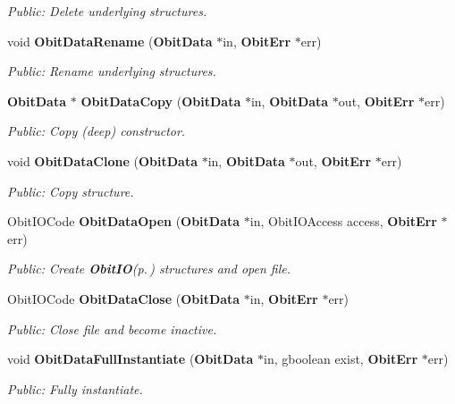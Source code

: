 \begin{CompactItemize}
\begin{CompactList}\small\item\em Public: Delete underlying structures. \item\end{CompactList}\item 
void {\bf Obit\-Data\-Rename} ({\bf Obit\-Data} $\ast$in, {\bf Obit\-Err} $\ast$err)
\begin{CompactList}\small\item\em Public: Rename underlying structures. \item\end{CompactList}\item 
{\bf Obit\-Data} $\ast$ {\bf Obit\-Data\-Copy} ({\bf Obit\-Data} $\ast$in, {\bf Obit\-Data} $\ast$out, {\bf Obit\-Err} $\ast$err)
\begin{CompactList}\small\item\em Public: Copy (deep) constructor. \item\end{CompactList}\item 
void {\bf Obit\-Data\-Clone} ({\bf Obit\-Data} $\ast$in, {\bf Obit\-Data} $\ast$out, {\bf Obit\-Err} $\ast$err)
\begin{CompactList}\small\item\em Public: Copy structure. \item\end{CompactList}\item 
Obit\-IOCode {\bf Obit\-Data\-Open} ({\bf Obit\-Data} $\ast$in, Obit\-IOAccess access, {\bf Obit\-Err} $\ast$err)
\begin{CompactList}\small\item\em Public: Create {\bf Obit\-IO}{\rm (p.\,\pageref{structObitIO})} structures and open file. \item\end{CompactList}\item 
Obit\-IOCode {\bf Obit\-Data\-Close} ({\bf Obit\-Data} $\ast$in, {\bf Obit\-Err} $\ast$err)
\begin{CompactList}\small\item\em Public: Close file and become inactive. \item\end{CompactList}\item 
void {\bf Obit\-Data\-Full\-Instantiate} ({\bf Obit\-Data} $\ast$in, gboolean exist, {\bf Obit\-Err} $\ast$err)
\begin{CompactList}\small\item\em Public: Fully instantiate. \item\end{CompactList}\item 

\end{CompactItemize}
